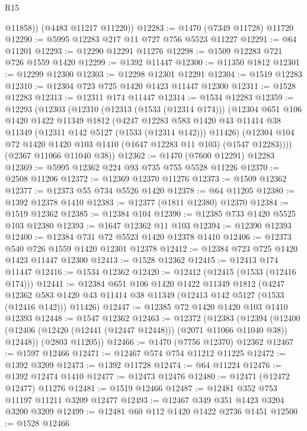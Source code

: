 \begin{lexlean}{R15}
\begin{coremodule}
          @11858))
      (@4483 @11217 @11220))
@12283 := @1470 (@7349 @11728) @11720
@12290 := @5995 @12283 @217 @11 @727 @756 @5523 @11227
@12291 := @64 @11201
@12293 := @12290 @12291 @11276
@12298 := @1509 @12283 @721 @726 @1559 @1420
@12299 := @1392 @11447
@12300 := @11350 @1812
@12301 := @12299 @12300
@12303 := @12298 @12301 @12291
@12304 := @1519 @12283
@12310 := @12304 @723 @725 @1420 @1423 @11447 @12300
@12311 := @1528 @12283
@12313 := @12311 @174 @11447
@12314 := @1534 @12283
@12359 := @12293
    (@12303
      (@12310
        (@12313 (@1533 (@12314 @174)))
        (@12304
          @651
          @106
          @1420
          @1422
          @11349
          @1812
          (@4247
            @12283
            @583
            @1420
            @43
            @11414
            @38
            @11349
            (@12311 @142 @5127 (@1533 (@12314 @142)))
            @11426)
          (@12304 @104 @72 @1420 @1420 @103 @1410 (@1647 @12283 @11 @103) (@1547 @12283))))
      (@2367 @11066 @11040 @38))
@12362 := @1470 (@7600 @12291) @12283
@12369 := @5995 @12362 @224 @93 @735 @755 @5528 @11226
@12370 := @2508 @11206
@12372 := @12369 @12370 @11276
@12373 := @1509 @12362
@12377 := @12373 @55 @734 @5526 @1420
@12378 := @64 @11205
@12380 := @1392 @12378 @1410
@12383 := @12377 (@1811 @12380) @12370
@12384 := @1519 @12362
@12385 := @12384 @104
@12390 := @12385 @733 @1420 @5525 @103 @12380
@12393 := @1647 @12362 @11 @103
@12394 := @12390 @12393
@12400 := @12384 @731 @72 @5523 @1420 @12378 @1410
@12406 := @12373 @540 @726 @1559 @1420 @12301 @12378
@12412 := @12384 @723 @725 @1420 @1423 @11447 @12300
@12413 := @1528 @12362
@12415 := @12413 @174 @11447
@12416 := @1534 @12362
@12420 := @12412 (@12415 (@1533 (@12416 @174)))
@12441 := @12384
    @651
    @106
    @1420
    @1422
    @11349
    @1812
    (@4247 @12362 @583 @1420 @43 @11414 @38 @11349 (@12413 @142 @5127 (@1533 (@12416 @142))) @11426)
@12447 := @12385 @72 @1420 @1420 @103 @1410 @12393
@12448 := @1547 @12362
@12463 := @12372
    (@12383
      (@12394 (@12400 (@12406 (@12420 (@12441 (@12447 @12448))) (@2071 @11066 @11040 @38)) @12448))
      (@2803 @11205))
@12466 := @1470 (@7756 @12370) @12362
@12467 := @1597 @12466
@12471 := @12467 @574 @754 @11212 @11225
@12472 := @1392 @3209
@12473 := @1392 @11728
@12474 := @64 @11224
@12476 := @1392 @12474 @1410
@12477 := @12473 @12476
@12480 := @12471 (@12472 @12477) @11276
@12481 := @1519 @12466
@12487 := @12481 @352 @753 @11197 @11211 @3209 @12477
@12493 := @12467 @349 @351 @1423 @3204 @3200 @3209
@12499 := @12481 @60 @112 @1420 @1422 @2736 @1451
@12500 := @1528 @12466

\end{coremodule}
\end{lexlean}
